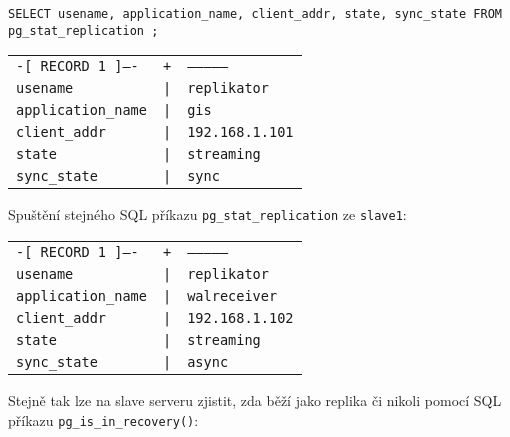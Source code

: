 \begin{lstlisting}
SELECT usename, application_name, client_addr, state, sync_state FROM pg_stat_replication ;
\end{lstlisting}

    \begin{table}[H]
      \label{pgHba}
        \begin{center}
          \begin{tabular}{lll}
            \texttt{-[ RECORD 1 ]----} & \texttt{+} & \texttt{--------------}\\
                      \texttt{usename} &           \texttt{|} &  \texttt{replikator}\\
            \texttt{application\_name} &  \texttt{|} &  \texttt{gis}\\
                 \texttt{client\_addr} &       \texttt{|} &  \texttt{192.168.1.101}\\
                        \texttt{state} &             \texttt{|} &  \texttt{streaming}\\
                  \texttt{sync\_state} &        \texttt{|} &  \texttt{sync}\\
          \end{tabular}
        \end{center}
    \end{table}

Spuštění stejného SQL příkazu \texttt{pg\_stat\_replication} ze \texttt{slave1}:

    \begin{table}[H]
      \label{pgHba}
        \begin{center}
          \begin{tabular}{lll}
            \texttt{-[ RECORD 1 ]----} & \texttt{+} & \texttt{--------------}\\
                      \texttt{usename} &           \texttt{|} &  \texttt{replikator}\\
            \texttt{application\_name} &  \texttt{|} &  \texttt{walreceiver}\\
                 \texttt{client\_addr} &       \texttt{|} &  \texttt{192.168.1.102}\\
                        \texttt{state} &             \texttt{|} &  \texttt{streaming}\\
                  \texttt{sync\_state} &        \texttt{|} &  \texttt{async}\\
          \end{tabular}
        \end{center}
    \end{table}
Stejně tak lze na slave serveru zjistit, zda běží jako replika či nikoli pomocí SQL příkazu \texttt{pg\_is\_in\_recovery()}:

